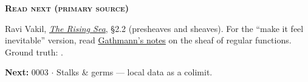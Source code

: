 \begin{primarybox}
\textbf{\textsc{\textcolor{accentB}{Read next (primary source)}}}\par\smallskip
Ravi Vakil, \href{https://math.stanford.edu/~vakil/216blog/FOAGaug2922public.pdf}{\emph{The Rising
Sea}}, \S2.2 (presheaves and sheaves). For the ``make it feel inevitable'' version, read
\href{https://agag-gathmann.math.rptu.de/class/alggeom-2021/alggeom-2021.pdf}{Gathmann's notes} on
the sheaf of regular functions. Ground truth: .
\end{primarybox}

\medskip
\noindent\textbf{Next:} 0003 $\cdot$ Stalks \& germs --- local data as a colimit.
